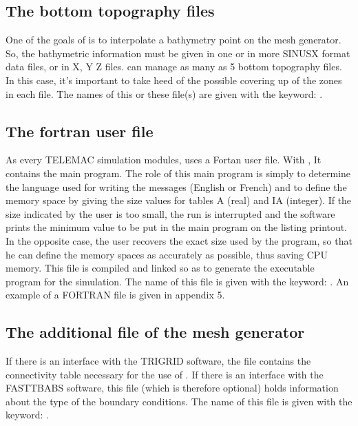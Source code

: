 \subsection{The bottom topography files}
One of the goals of \stbtel is to interpolate a bathymetry point on the mesh
generator.  So, the bathymetric information must be given in one or in more
SINUSX format data files, or in X, Y Z files.
\stbtel can manage as many as 5 bottom topography files. In this case, it’s
important to take heed of the possible covering up of the zones in each file.
The names of this or these file(s) are given with the keyword: .
\subsection{The fortran user file}
As every TELEMAC simulation modules, \stbtel uses a Fortan user file.  With
\stbtel, It contains the main program. The role of this main program is simply
to determine the language used for writing the messages (English or French) and
to define the memory space by giving the size values for tables A (real) and IA
(integer).
If the size indicated by the user is too small, the \stbtel run is interrupted
and the software prints the minimum value to be put in the main program on the
listing printout. In the opposite case, the user recovers the exact size used
by the program, so that he can define the memory spaces as accurately as
possible, thus saving CPU memory.
This file is compiled and linked so as to generate the executable program for
the simulation.
The name of this file is given with the keyword: .
An example of a FORTRAN file is given in appendix 5.
\subsection{The additional file of the mesh generator}
If there is an interface with the TRIGRID software, the file contains the
connectivity table necessary for the use of \stbtel.
If there is an interface with the FASTTBABS software, this file (which is
therefore optional) holds information about the type of the boundary
conditions.
The name of this file is given with the keyword: .

